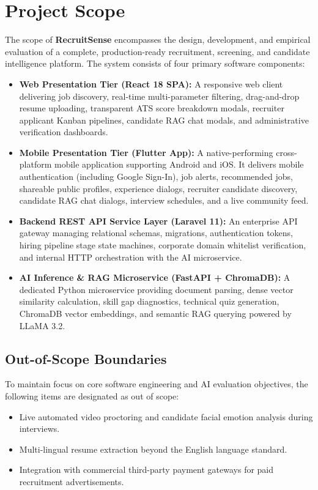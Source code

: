 \section{Project Scope}
The scope of \textbf{RecruitSense} encompasses the design, development, and empirical evaluation of a complete, production-ready recruitment, screening, and candidate intelligence platform. The system consists of four primary software components:

\begin{itemize}
    \item \textbf{Web Presentation Tier (React 18 SPA):} A responsive web client delivering job discovery, real-time multi-parameter filtering, drag-and-drop resume uploading, transparent ATS score breakdown modals, recruiter applicant Kanban pipelines, candidate RAG chat modals, and administrative verification dashboards.
    \item \textbf{Mobile Presentation Tier (Flutter App):} A native-performing cross-platform mobile application supporting Android and iOS. It delivers mobile authentication (including Google Sign-In), job alerts, recommended jobs, shareable public profiles, experience dialogs, recruiter candidate discovery, candidate RAG chat dialogs, interview schedules, and a live community feed.
    \item \textbf{Backend REST API Service Layer (Laravel 11):} An enterprise API gateway managing relational schemas, migrations, authentication tokens, hiring pipeline stage state machines, corporate domain whitelist verification, and internal HTTP orchestration with the AI microservice.
    \item \textbf{AI Inference \& RAG Microservice (FastAPI + ChromaDB):} A dedicated Python microservice providing document parsing, dense vector similarity calculation, skill gap diagnostics, technical quiz generation, ChromaDB vector embeddings, and semantic RAG querying powered by LLaMA 3.2.
\end{itemize}

\subsection*{Out-of-Scope Boundaries}
To maintain focus on core software engineering and AI evaluation objectives, the following items are designated as out of scope:
\begin{itemize}
    \item Live automated video proctoring and candidate facial emotion analysis during interviews.
    \item Multi-lingual resume extraction beyond the English language standard.
    \item Integration with commercial third-party payment gateways for paid recruitment advertisements.
\end{itemize}

